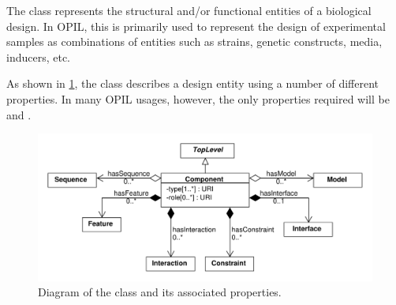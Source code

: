 The  class represents the structural and/or functional entities of a biological design. 
In OPIL, this is primarily used to represent the design of experimental samples as combinations of entities such as strains, genetic constructs, media, inducers, etc.

As shown in \ref{uml:component}, the  class describes a design entity using a number of different properties.
In many OPIL usages, however, the only properties required will be  and .

\begin{figure}[ht]
\begin{center}
\includegraphics[scale=0.6]{sbol_uml/component}
\caption[]{Diagram of the  class and its associated properties.}
\label{uml:component}
\end{center}
\end{figure} 

